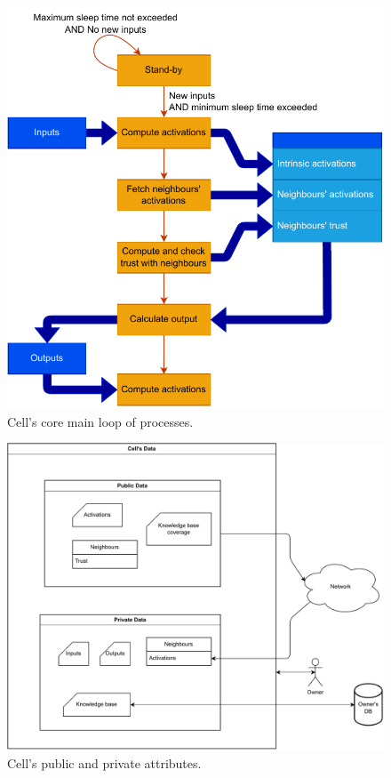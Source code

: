 \begin{figure}[h!]
    \centering
    \includegraphics[width=12cm]{figures/chapter4/cell/processes.pdf}
    \caption{Cell's core main loop of processes.}
    \label{fig:cellprocesses}
\end{figure}

\begin{figure}[h!]
    \centering
    \includegraphics[width=\linewidth]{figures/chapter4/cell/data.pdf}
    \caption{Cell's public and private attributes.}
    \label{fig:celldata}
\end{figure}


